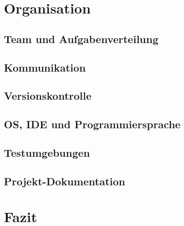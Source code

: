 \documentclass[12pt,a4paper]{article}
\begin{document}
\newpage

\section{Organisation}

\subsection{Team und Aufgabenverteilung}

\subsection{Kommunikation}

\subsection{Versionskontrolle}

\subsection{OS, IDE und Programmiersprache}

\subsection{Testumgebungen}

\subsection{Projekt-Dokumentation}

\newpage
\section{Fazit}
\end{document}
